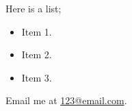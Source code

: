 \documentclass[12pt,busletter,addrfromright,orderfromdateto]{newlfm}
\begin{document}
\begin{newlfm}


\lipsum[1]

\lipsum[2]

Here is a list;
\begin{itemize}
    \item Item 1.
    \item Item 2.
    \item Item 3.
\end{itemize}

\lipsum[3]

Email me at \href{mailto:123@email.com}{123@email.com}. 



\end{newlfm}
\end{document}
